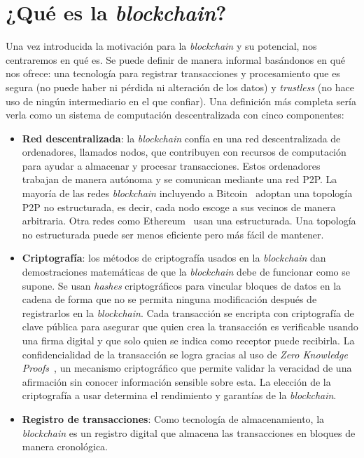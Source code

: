 \section{¿Qué es la \textit{blockchain}?}
Una vez introducida la motivación para la \textit{blockchain} y su potencial, nos centraremos en qué es. Se puede definir de manera informal basándonos en qué nos ofrece: una tecnología para registrar transacciones y procesamiento que es segura (no puede haber ni pérdida ni alteración de los datos) y \textit{trustless} (no hace uso de ningún intermediario en el que confiar). Una definición más completa sería verla como un sistema de computación descentralizada con cinco componentes:
\begin{itemize}
    \item \textbf{Red descentralizada}: la \textit{blockchain} confía en una red descentralizada de ordenadores, llamados nodos, que contribuyen con recursos de computación para ayudar a almacenar y procesar transacciones. Estos ordenadores trabajan de manera autónoma y se comunican mediante una red \ac{P2P}. La mayoría de las redes \textit{blockchain} incluyendo a Bitcoin~\cite{bitcoin} adoptan una topología \ac{P2P} no estructurada, es decir, cada nodo escoge a sus vecinos de manera arbitraria. Otra redes como Ethereum~\cite{ethereum} usan una estructurada. Una topología no estructurada puede ser menos eficiente pero más fácil de mantener.
    \item \textbf{Criptografía}: los métodos de criptografía usados en la \textit{blockchain} dan demostraciones matemáticas de que la \textit{blockchain} debe de funcionar como se supone. Se usan \textit{hashes} criptográficos para vincular bloques de datos en la cadena de forma que no se permita ninguna modificación después de registrarlos en la \textit{blockchain}. Cada transacción se encripta con criptografía de clave pública para asegurar que quien crea la transacción es verificable usando una firma digital y que solo quien se indica como receptor puede recibirla. La confidencialidad de la transacción se logra gracias al uso de \textit{Zero Knowledge Proofs}~\cite{zkp-blockchain}, un mecanismo criptográfico que permite validar la veracidad de una afirmación sin conocer información sensible sobre esta. La elección de la criptografía a usar determina el rendimiento y garantías de la \textit{blockchain}.
    \item \textbf{Registro de transacciones}: Como tecnología de almacenamiento, la \textit{blockchain} es un registro digital que almacena las transacciones en bloques de manera cronológica.

\end{itemize}
